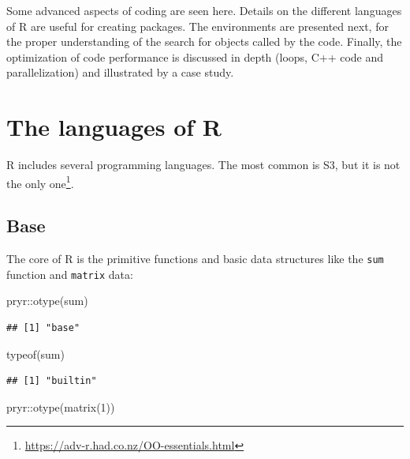 \documentclass[
  12pt,
  american,
  a4paper,
  extrafontsizes,onecolumn,openright
  ]{memoir}
\newenvironment{Shaded}{\begin{snugshade}}{\end{snugshade}}
\newcommand{\DecValTok}[1]{\textcolor[rgb]{0.00,0.00,0.81}{#1}}
\newcommand{\FunctionTok}[1]{\textcolor[rgb]{0.00,0.00,0.00}{#1}}
\newcommand{\NormalTok}[1]{#1}
\newcommand{\SpecialCharTok}[1]{\textcolor[rgb]{0.00,0.00,0.00}{#1}}
\newlength{\rf}
\begin{document}
Some advanced aspects of coding are seen here.
Details on the different languages of R are useful for creating packages.
The environments are presented next, for the proper understanding of the search for objects called by the code.
Finally, the optimization of code performance is discussed in depth (loops, C++ code and parallelization) and illustrated by a case study.

\hypertarget{the-languages-of-r}{%
\section{The languages of R}\label{the-languages-of-r}}

R includes several programming languages.
The most common is S3, but it is not the only one\footnote{\url{https://adv-r.had.co.nz/OO-essentials.html}}.

\hypertarget{base}{%
\subsection{Base}\label{base}}

The core of R is the primitive functions and basic data structures like the \texttt{sum} function and \texttt{matrix} data:

\scriptsize

\begin{Shaded}
\begin{Highlighting}[]
\NormalTok{pryr}\SpecialCharTok{::}\FunctionTok{otype}\NormalTok{(sum)}
\end{Highlighting}
\end{Shaded}

\begin{verbatim}
## [1] "base"
\end{verbatim}

\begin{Shaded}
\begin{Highlighting}[]
\FunctionTok{typeof}\NormalTok{(sum)}
\end{Highlighting}
\end{Shaded}

\begin{verbatim}
## [1] "builtin"
\end{verbatim}

\begin{Shaded}
\begin{Highlighting}[]
\NormalTok{pryr}\SpecialCharTok{::}\FunctionTok{otype}\NormalTok{(}\FunctionTok{matrix}\NormalTok{(}\DecValTok{1}\NormalTok{))}
\end{Highlighting}
\end{Shaded}
\end{document}
